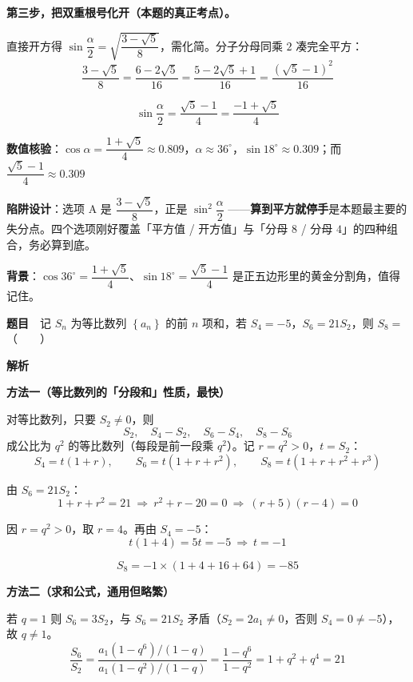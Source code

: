 \textbf{第三步，把双重根号化开（本题的真正考点）。}

直接开方得 $\sin\dfrac\alpha2=\sqrt{\dfrac{3-\sqrt5}8}$，需化简。分子分母同乘 $2$ 凑完全平方：
\[\frac{3-\sqrt5}8=\frac{6-2\sqrt5}{16}=\frac{5-2\sqrt5+1}{16}=\frac{\left(\sqrt5-1\right)^{2}}{16}\]

\[\sin\frac\alpha2=\frac{\sqrt5-1}4=\frac{-1+\sqrt5}4\]

\textbf{数值核验}：$\cos\alpha=\dfrac{1+\sqrt5}4\approx0.809$，$\alpha\approx36^\circ$，$\sin18^\circ\approx0.309$；而 $\dfrac{\sqrt5-1}4\approx0.309$ 


\begin{gktip}
\textbf{陷阱设计}：选项 A 是 $\dfrac{3-\sqrt5}8$，正是 $\sin^{2}\dfrac\alpha2$ ——\textbf{算到平方就停手}是本题最主要的失分点。四个选项刚好覆盖「平方值 / 开方值」与「分母 $8$ / 分母 $4$」的四种组合，务必算到底。

\textbf{背景}：$\cos36^\circ=\dfrac{1+\sqrt5}4$、$\sin18^\circ=\dfrac{\sqrt5-1}4$ 是正五边形里的黄金分割角，值得记住。
\end{gktip}

\par\medskip


\textbf{题目}　记 $S_n$ 为等比数列 $\left\{a_n\right\}$ 的前 $n$ 项和，若 $S_4=-5$，$S_6=21S_2$，则 $S_8=$（　　）

\textbf{解析}

\textbf{方法一（等比数列的「分段和」性质，最快）}

对等比数列，只要 $S_2\ne0$，则
\[S_2,\quad S_4-S_2,\quad S_6-S_4,\quad S_8-S_6\]
成公比为 $q^{2}$ 的等比数列（每段是前一段乘 $q^{2}$）。记 $r=q^{2}>0$，$t=S_2$：
\[S_4=t(1+r),\qquad S_6=t\left(1+r+r^{2}\right),\qquad S_8=t\left(1+r+r^{2}+r^{3}\right)\]

由 $S_6=21S_2$：
\[1+r+r^{2}=21\ \Longrightarrow\ r^{2}+r-20=0\ \Longrightarrow\ (r+5)(r-4)=0\]

因 $r=q^{2}>0$，取 $r=4$。再由 $S_4=-5$：
\[t(1+4)=5t=-5\ \Longrightarrow\ t=-1\]

\[S_8=-1\times\left(1+4+16+64\right)=-85\]

\textbf{方法二（求和公式，通用但略繁）}

若 $q=1$ 则 $S_6=3S_2$，与 $S_6=21S_2$ 矛盾（$S_2=2a_1\ne0$，否则 $S_4=0\ne-5$），故 $q\ne1$。
\[\frac{S_6}{S_2}=\frac{a_1\left(1-q^{6}\right)/(1-q)}{a_1\left(1-q^{2}\right)/(1-q)}=\frac{1-q^{6}}{1-q^{2}}=1+q^{2}+q^{4}=21\]

